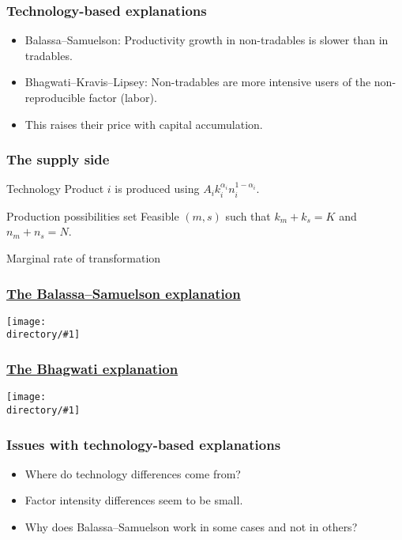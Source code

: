 \documentclass[compress,mathserif]{beamer}
\newcounter{perc}
\newcounter{percek}
\newcommand{\directory}{figures}
\newcommand{\widefigure}[2]{\begin{frame}\frametitle{\hyperlink{#1back}{#2}}\hypertarget{#1}{{\begin{center}\texttt{[image: \\directory/\#1]}\end{center}}}\end{frame}}
\renewcommand{\time}[1]{\addtocounter{percek}{#1}}
\begin{document}
\time 2

\begin{frame}\frametitle{Technology-based explanations}

\begin{itemize}
    \item Balassa--Samuelson: Productivity growth in non-tradables is slower than in tradables.
    \item Bhagwati--Kravis--Lipsey: Non-tradables are more intensive users of the non-reproducible factor (labor).
    \item This raises their price with capital accumulation.
\end{itemize}
\end{frame}

\begin{frame}\frametitle{The supply side}

\begin{block}{Technology}
Product $i$ is produced using $A_ik_i^{\alpha_i}n_i^{1-\alpha_i}$.
\end{block}

\begin{block}{Production possibilities set}
Feasible $(m,s)$ such that $k_m+k_s = K$ and $n_m+n_s = N$.
\end{block}

\begin{block}{Marginal rate of transformation}

\end{block}
\end{frame}

\widefigure{PPF-balassa}{The Balassa--Samuelson explanation}
\widefigure{PPF-bhagwati}{The Bhagwati explanation}


\begin{frame}\frametitle{Issues with technology-based explanations}

\begin{itemize}
    \item Where do technology differences come from?
    \item Factor intensity differences seem to be small.
    \item Why does Balassa--Samuelson work in some cases and not in others?
\end{itemize}
\end{frame}
\end{document}
